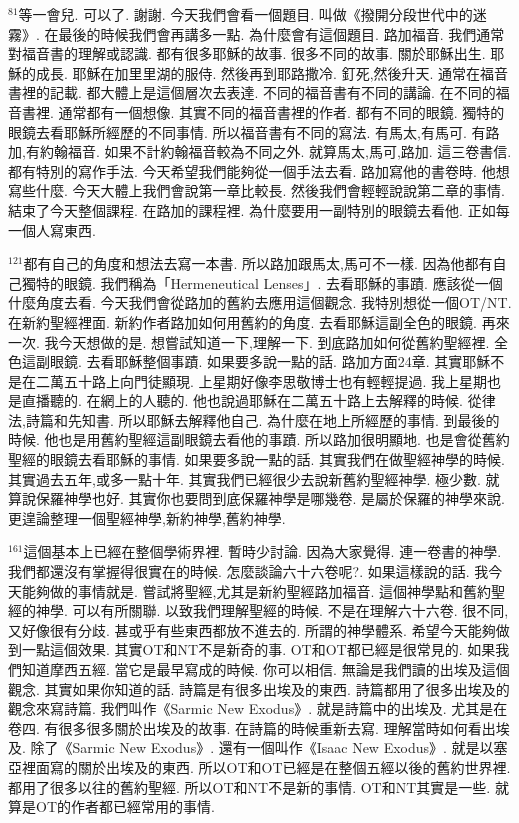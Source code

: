 \documentclass{book}
\begin{document}
$^{81}$等一會兒.
可以了.
謝謝.
今天我們會看一個題目.
叫做《撥開分段世代中的迷霧》.
在最後的時候我們會再講多一點.
為什麼會有這個題目.
路加福音.
我們通常對福音書的理解或認識.
都有很多耶穌的故事.
很多不同的故事.
關於耶穌出生.
耶穌的成長.
耶穌在加里里湖的服侍.
然後再到耶路撒冷.
釘死,然後升天.
通常在福音書裡的記載.
都大體上是這個層次去表達.
不同的福音書有不同的講論.
在不同的福音書裡.
通常都有一個想像.
其實不同的福音書裡的作者.
都有不同的眼鏡.
獨特的眼鏡去看耶穌所經歷的不同事情.
所以福音書有不同的寫法.
有馬太,有馬可.
有路加,有約翰福音.
如果不計約翰福音較為不同之外.
就算馬太,馬可,路加.
這三卷書信.
都有特別的寫作手法.
今天希望我們能夠從一個手法去看.
路加寫他的書卷時.
他想寫些什麼.
今天大體上我們會說第一章比較長.
然後我們會輕輕說說第二章的事情.
結束了今天整個課程.
在路加的課程裡.
為什麼要用一副特別的眼鏡去看他.
正如每一個人寫東西.

$^{121}$都有自己的角度和想法去寫一本書.
所以路加跟馬太,馬可不一樣.
因為他都有自己獨特的眼鏡.
我們稱為「Hermeneutical Lenses」.
去看耶穌的事蹟.
應該從一個什麼角度去看.
今天我們會從路加的舊約去應用這個觀念.
我特別想從一個OT/NT.
在新約聖經裡面.
新約作者路加如何用舊約的角度.
去看耶穌這副全色的眼鏡.
再來一次.
我今天想做的是.
想嘗試知道一下,理解一下.
到底路加如何從舊約聖經裡.
全色這副眼鏡.
去看耶穌整個事蹟.
如果要多說一點的話.
路加方面24章.
其實耶穌不是在二萬五十路上向門徒顯現.
上星期好像李思敬博士也有輕輕提過.
我上星期也是直播聽的.
在網上的人聽的.
他也說過耶穌在二萬五十路上去解釋的時候.
從律法,詩篇和先知書.
所以耶穌去解釋他自己.
為什麼在地上所經歷的事情.
到最後的時候.
他也是用舊約聖經這副眼鏡去看他的事蹟.
所以路加很明顯地.
也是會從舊約聖經的眼鏡去看耶穌的事情.
如果要多說一點的話.
其實我們在做聖經神學的時候.
其實過去五年,或多一點十年.
其實我們已經很少去說新舊約聖經神學.
極少數.
就算說保羅神學也好.
其實你也要問到底保羅神學是哪幾卷.
是屬於保羅的神學來說.
更遑論整理一個聖經神學,新約神學,舊約神學.

$^{161}$這個基本上已經在整個學術界裡.
暫時少討論.
因為大家覺得.
連一卷書的神學.
我們都還沒有掌握得很實在的時候.
怎麼談論六十六卷呢?.
如果這樣說的話.
我今天能夠做的事情就是.
嘗試將聖經,尤其是新約聖經路加福音.
這個神學點和舊約聖經的神學.
可以有所關聯.
以致我們理解聖經的時候.
不是在理解六十六卷.
很不同,又好像很有分歧.
甚或乎有些東西都放不進去的.
所謂的神學體系.
希望今天能夠做到一點這個效果.
其實OT和NT不是新奇的事.
OT和OT都已經是很常見的.
如果我們知道摩西五經.
當它是最早寫成的時候.
你可以相信.
無論是我們讀的出埃及這個觀念.
其實如果你知道的話.
詩篇是有很多出埃及的東西.
詩篇都用了很多出埃及的觀念來寫詩篇.
我們叫作《Sarmic New Exodus》.
就是詩篇中的出埃及.
尤其是在卷四.
有很多很多關於出埃及的故事.
在詩篇的時候重新去寫.
理解當時如何看出埃及.
除了《Sarmic New Exodus》.
還有一個叫作《Isaac New Exodus》.
就是以塞亞裡面寫的關於出埃及的東西.
所以OT和OT已經是在整個五經以後的舊約世界裡.
都用了很多以往的舊約聖經.
所以OT和NT不是新的事情.
OT和NT其實是一些.
就算是OT的作者都已經常用的事情.
\end{document}

